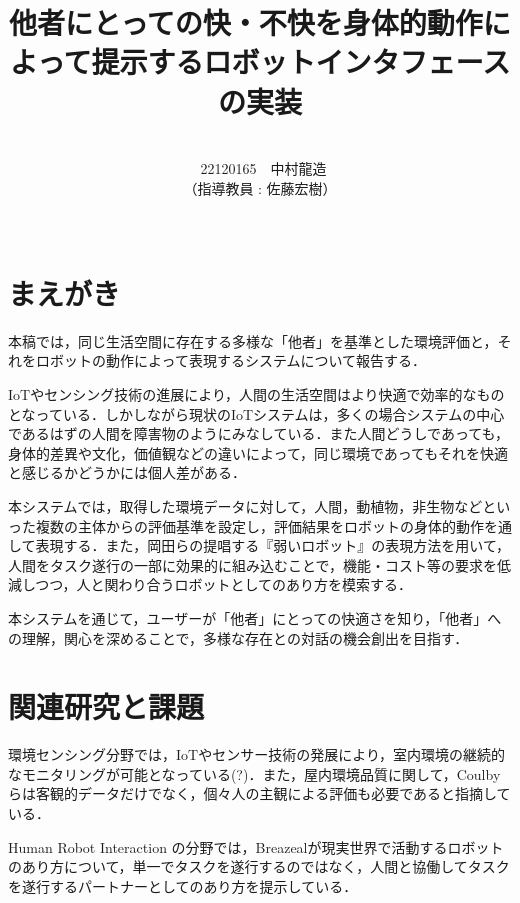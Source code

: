 \documentclass[paper=a4paper,jafontsize=9pt,head_space=15mm,gutter=20mm,
twocolumn,number_of_lines=49, line_length=26zw]{myuarticle}
\begin{document}
\title{{\LARGE\bfseries\gtfamily 他者にとっての快・不快を身体的動作によって提示するロボットインタフェースの実装}}
\author{\\\ 22120165　中村龍造 \\ （指導教員 : 佐藤宏樹）\\ \\}
\date{}
\maketitle

\section{まえがき}
本稿では，同じ生活空間に存在する多様な「他者」を基準とした環境評価と，それをロボットの動作によって表現するシステムについて報告する．

IoTやセンシング技術の進展により，人間の生活空間はより快適で効率的なものとなっている．しかしながら現状のIoTシステムは，多くの場合システムの中心であるはずの人間を障害物のようにみなしている．\cite{Petrov-2018-WhenIoTKeepsPeople}また人間どうしであっても，身体的差異や文化，価値観などの違いによって，同じ環境であってもそれを快適と感じるかどうかには個人差がある．

本システムでは，取得した環境データに対して，人間，動植物，非生物などといった複数の主体からの評価基準を設定し，評価結果をロボットの身体的動作を通して表現する．また，岡田ら\cite{岡田-2017-弱いロボ}の提唱する『弱いロボット』の表現方法を用いて，人間をタスク遂行の一部に効果的に組み込むことで，機能・コスト等の要求を低減しつつ，人と関わり合うロボットとしてのあり方を模索する．

本システムを通じて，ユーザーが「他者」にとっての快適さを知り，「他者」への理解，関心を深めることで，多様な存在との対話の機会創出を目指す．

\section{関連研究と課題}
環境センシング分野では，IoTやセンサー技術の発展により，室内環境の継続的なモニタリングが可能となっている\cite{Saini-2020-IndoorAirQualityMonitoring}(?)．また，屋内環境品質に関して，Coulbyら\cite{Coulby-2020-ScopingReviewTechnologicalApproaches}は客観的データだけでなく，個々人の主観による評価も必要であると指摘している．

Human Robot
Interaction
の分野では，Breazeal\cite{C.Breazeal-2004-SocialInteractionsHRIRobot}が現実世界で活動するロボットのあり方について，単一でタスクを遂行するのではなく，人間と協働してタスクを遂行するパートナーとしてのあり方を提示している．
\end{document}
